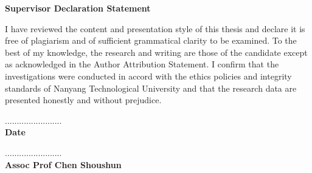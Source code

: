 \begin{center}
    \textbf{\large Supervisor Declaration Statement}
\end{center}


\noindent I have reviewed the content and presentation style of this thesis and declare it is free of plagiarism and of sufficient grammatical clarity to be examined. To the best of my knowledge, the research and writing are those of the candidate except as acknowledged in the Author Attribution Statement. I confirm that the investigations were conducted in accord with the ethics policies and integrity standards of Nanyang Technological University and that the research data are presented honestly and without prejudice.

\vspace{2in}

\begin{multicols}{2}
    \begin{flushleft}
        ........................ \\
        \textbf{Date}
    \end{flushleft}

    \columnbreak

    \begin{flushright}
        ........................ \\
        \textbf{Assoc Prof Chen Shoushun} \\
    \end{flushright}
\end{multicols}
